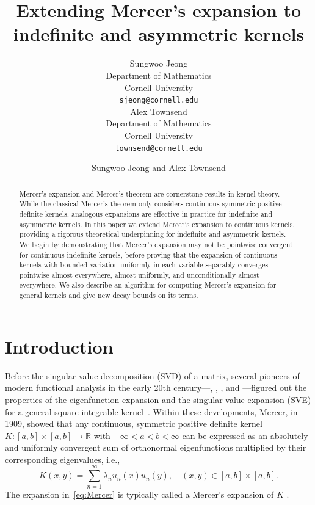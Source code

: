 \documentclass{article}
\title{Extending Mercer's expansion to indefinite and asymmetric kernels}
\author{Sungwoo Jeong \\
Department of Mathematics \\
Cornell University \\
\texttt{sjeong@cornell.edu} \\
\And
Alex Townsend\\
Department of Mathematics \\
Cornell University \\
\texttt{townsend@cornell.edu}
}
\author{Sungwoo Jeong and Alex Townsend}
\begin{document}
\maketitle %



\begin{abstract}
Mercer's expansion and Mercer's theorem are cornerstone results in kernel theory. While the classical Mercer's theorem only considers continuous symmetric positive definite kernels, analogous expansions are effective in practice for indefinite and asymmetric kernels. In this paper we extend Mercer's expansion to continuous kernels, providing a rigorous theoretical underpinning for indefinite and asymmetric kernels. We begin by demonstrating that Mercer's expansion may not be pointwise convergent for continuous indefinite kernels, before proving that the expansion of continuous kernels with bounded variation uniformly in each variable separably converges pointwise almost everywhere, almost uniformly, and unconditionally almost everywhere. We also describe an algorithm for computing Mercer's expansion for general kernels and give new decay bounds on its terms.
\end{abstract}

\maketitle %


\section{Introduction}

Before the singular value decomposition (SVD) of a matrix, several pioneers of modern functional analysis in the early 20th century---\citet{hammerstein1923entwickelung}, \citet{schmidt1907theorie}, \citet{smithies1938eigen}, and \citet{weyl1912asymptotische}---figured out the properties of the eigenfunction expansion and the singular value expansion (SVE) for a general square-integrable kernel~\citep{stewart1993early}. Within these developments, Mercer, in 1909, showed that any continuous, symmetric positive definite kernel $K:[a,b]\times [a,b]\rightarrow \mathbb{R}$ with $-\infty<a<b<\infty$ can be expressed as an absolutely and uniformly convergent sum of orthonormal eigenfunctions multiplied by their corresponding eigenvalues, i.e.,  
\begin{equation} 
K(x,y) = \sum_{n=1}^\infty \lambda_n u_n(x) u_n(y), \quad (x,y)\in [a,b]\times [a,b].
\label{eq:Mercer}
\end{equation} 
The expansion in~\cref{eq:Mercer} is typically called a Mercer's expansion of $K$ \citep{mercer1909xvi}.
\end{document}
